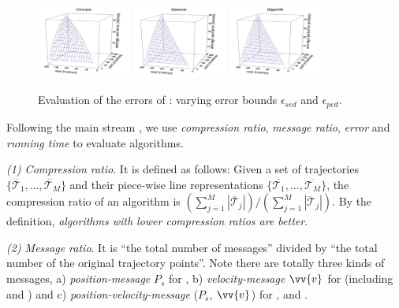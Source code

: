 {\begin{figure}[tb!]
	\centering
	\includegraphics[width= 0.275\textwidth]{figures/Fig-BITT-mopsi-ped-error.png}\hspace{4ex}
	\includegraphics[width= 0.275\textwidth]{figures/Fig-BITT-sercar-ped-error.png}\hspace{4ex}
	\includegraphics[width= 0.275\textwidth]{figures/Fig-BITT-geolife-ped-error.png}\hspace{0ex}
	\vspace{-3ex}
	\caption{\small Evaluation of the \ped errors of \bitt: varying error bounds $\epsilon_{sed}$ and $\epsilon_{ped}$.}
	\label{fig:bitt-ped-error}
	\vspace{-1ex}
\end{figure}

	
Following the main stream \cite{Trajcevski:LDRH, Lange:GRTS, Lange:Tracking, Lin:Cised, Zhang:Evaluation}, we use \emph{compression ratio}, \emph{message ratio}, \emph{error} and \emph{running time} to evaluate algorithms.

 \ni \emph{(1) Compression ratio}. {It is defined as follows: Given a set of trajectories $\{\dddot{\mathcal{T}_1}, \ldots, \dddot{\mathcal{T}_M}\}$ and their piece-wise line representations $\{\overline{\mathcal{T}_1}, \ldots, \overline{\mathcal{T}_M}\}$, the compression ratio of an algorithm is $(\sum_{j=1}^{M} |\overline{\mathcal{T}}_j |)/(\sum_{j=1}^{M} |\dddot{\mathcal{T}}_j |)$.
	By the definition, \emph{algorithms with lower compression ratios are better}.}

 \ni \emph{(2) Message ratio}. It is ``the total number of messages'' divided by ``the total number of the original trajectory points''. Note there are totally three kinds of messages, \ie a) \emph{position-message} $P_s$ for \grts, b) \emph{velocity-message} $\vv{v}$ for \bitt (including \citt and \sitt) and c) \emph{position-velocity-message} ($P_s$, $\vv{v}$) for \ldrh, \grts and \bitt. 
 

}
